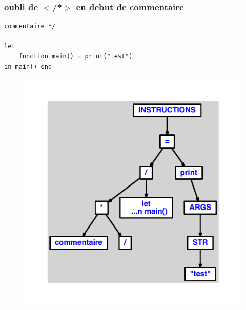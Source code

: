 \documentclass{article}
\begin{document}
\subsubsection{oubli de $ < $/*$ > $ en debut de commentaire}
\begin{lstlisting}
commentaire */

let
	function main() = print("test")
in main() end
\end{lstlisting}
\newpage
\begin{figure}[H]
\centering
\includegraphics[max width=\textwidth]{ast/ast_146.pdf}
\end{figure}
\newpage
\end{document}
